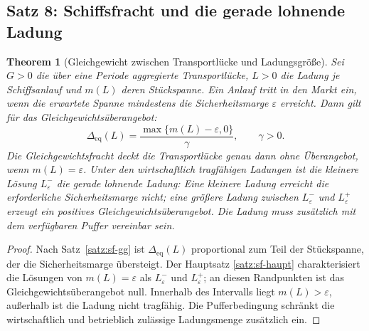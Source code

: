 \documentclass[a4paper, 12pt, twoside, openright]{report}
\newtheorem{theorem}{Theorem}[section]
\theoremstyle{definition}
\theoremstyle{definition}
\begin{document}
\subsection{Satz 8: Schiffsfracht und die gerade lohnende Ladung}

\begin{theorem}[Gleichgewicht zwischen Transportlücke und Ladungsgröße]
\label{thm:schiffsfracht-gleichgewicht}
Sei $G>0$ die über eine Periode aggregierte Transportlücke, $L>0$ die Ladung je
Schiffsanlauf und $m(L)$ deren Stückspanne. Ein Anlauf tritt in den Markt ein,
wenn die erwartete Spanne mindestens die Sicherheitsmarge $\varepsilon$ erreicht.
Dann gilt für das Gleichgewichtsüberangebot:
\begin{equation}
  \Delta_{\mathrm{eq}}(L)
  = \frac{\max\{m(L)-\varepsilon,0\}}{\gamma},
  \qquad \gamma>0.
\end{equation}
Die Gleichgewichtsfracht deckt die Transportlücke genau dann ohne Überangebot,
wenn $m(L)=\varepsilon$. Unter den wirtschaftlich tragfähigen Ladungen ist die
kleinere Lösung $L^-_\varepsilon$ die gerade lohnende Ladung: Eine kleinere
Ladung erreicht die erforderliche Sicherheitsmarge nicht; eine größere Ladung
zwischen $L^-_\varepsilon$ und $L^+_\varepsilon$ erzeugt ein positives
Gleichgewichtsüberangebot. Die Ladung muss zusätzlich mit dem verfügbaren Puffer
vereinbar sein.
\end{theorem}

\begin{proof}
Nach Satz~\ref{satz:sf-gg} ist $\Delta_{\mathrm{eq}}(L)$ proportional zum Teil
der Stückspanne, der die Sicherheitsmarge übersteigt. Der Hauptsatz
\ref{satz:sf-haupt} charakterisiert die Lösungen von $m(L)=\varepsilon$ als
$L^-_\varepsilon$ und $L^+_\varepsilon$; an diesen Randpunkten ist das
Gleichgewichtsüberangebot null. Innerhalb des Intervalls liegt $m(L)>\varepsilon$,
außerhalb ist die Ladung nicht tragfähig. Die Pufferbedingung schränkt die
wirtschaftlich und betrieblich zulässige Ladungsmenge zusätzlich ein.
\end{proof}
\end{document}
